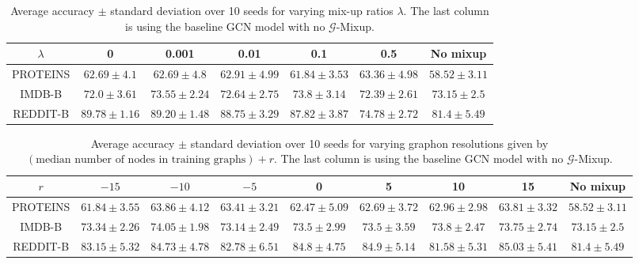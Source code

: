 {\small \setlength\tabcolsep{1.5pt} \begin{table}[h]
    \centering
    \begin{adjustwidth}{-1em}{-1em}
    \begin{tabular}{c|c|c|c|c|c|c}
        $\lambda$ & 0 & 0.001 & 0.01 & 0.1 & 0.5 & No mixup \\
        \hline
        PROTEINS & $62.69\pm 4.1$ & $62.69\pm 4.8$ & $62.91\pm 4.99$ & $61.84\pm 3.53$ & $63.36\pm 4.98$ & $58.52 \pm 3.11$ \\
        IMDB-B & $72.0 \pm 3.61$ & $73.55 \pm 2.24$ & $72.64 \pm 2.75$ & $73.8 \pm 3.14$ & $72.39 \pm 2.61$ &  $73.15 \pm 2.5$ \\
        REDDIT-B & $89.78 \pm 1.16$ & $89.20 \pm 1.48$ & $88.75 \pm 3.29$ & $87.82 \pm 3.87$ & $74.78 \pm 2.72$ & $81.4 \pm 5.49$
    \end{tabular}
    \caption{Average accuracy $\pm$ standard deviation over 10 seeds for varying mix-up ratios $\lambda$. The last column is using the baseline GCN model with no $\mathcal{G}$-Mixup.}
    \label{tab:lam-search}
    \end{adjustwidth}
\end{table}}


{\small \setlength\tabcolsep{1.5pt} \begin{table}[h]
    \centering
    \begin{adjustwidth}{-5em}{-5em}
    \begin{tabular}{c|c|c|c|c|c|c|c|c}
        $r$ & $-15$ & $-10$ & $-5$ & 0 & 5 & 10 & 15 & No mixup \\
        \hline
        PROTEINS & $61.84\pm3.55$ & $63.86\pm 4.12$ & $63.41\pm3.21$ & $62.47\pm5.09$ & $62.69\pm3.72$ & $62.96\pm2.98$ & $63.81\pm3.32$ & $58.52 \pm 3.11$ \\
        IMDB-B & $73.34 \pm 2.26$ & $74.05 \pm 1.98$ & $73.14 \pm 2.49$ & $73.5 \pm 2.99$ & $73.5 \pm 3.59$ & $73.8 \pm 2.47$ & $73.75 \pm 2.74$ & $73.15 \pm 2.5$ \\
        REDDIT-B &  $83.15 \pm 5.32$ & $84.73 \pm 4.78$ & $82.78 \pm 6.51$ & $84.8 \pm 4.75$ & $84.9 \pm 5.14$ & $81.58 \pm 5.31$ & $85.03 \pm 5.41$ & $81.4 \pm 5.49$
    \end{tabular}
    \caption{Average accuracy $\pm$ standard deviation over 10 seeds for varying graphon resolutions given by $(\text{median number of nodes in training graphs})+r$. The last column is using the baseline GCN model with no $\mathcal{G}$-Mixup.}
    \label{tab:res-search}
    \end{adjustwidth}
\end{table}}

